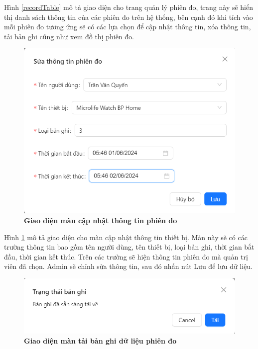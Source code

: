 Hình \ref{recordTable} mô tả giao diện cho trang quản lý phiên đo, trang này sẽ hiển thị danh sách
thông tin của các phiên đo trên hệ thống, bên cạnh đó khi tích vào mỗi phiên đo tương ứng sẽ 
có các lựa chọn để cập nhật thông tin, xóa thông tin, tải bản ghi cũng như xem đồ thị phiên đo. 

\begin{figure}[H]
  \centering
  \includegraphics[scale=0.7]{Images/server/webUI/editRecord.png}
  \caption[Giao diện màn cập nhật thông tin phiên đo]{\bfseries \fontsize{12pt}{0pt}\selectfont Giao diện màn cập nhật thông tin phiên đo}
  \label{editRecord} %
\end{figure}

Hình \ref{editRecord} mô tả giao diện cho màn cập nhật thông tin thiết bị. Màn này sẽ có các trường thông tin bao gồm 
tên người dùng, tên thiết bị, loại bản ghi, thời gian bắt đầu, thời gian kết thúc. Trên các trường sẽ hiện thông tin phiên đo mà quản trị viên đã chọn. 
Admin sẽ chỉnh sửa thông tin, sau đó nhấn nút Lưu để lưu dữ liệu.

\begin{figure}[H]
  \centering
  \includegraphics[scale=0.7]{Images/server/webUI/downloadRecord.png}
  \caption[Giao diện màn tải bản ghi dữ liệu phiên đo]{\bfseries \fontsize{12pt}{0pt}\selectfont Giao diện màn tải bản ghi dữ liệu phiên đo}
  \label{downloadRecord} %
\end{figure}

